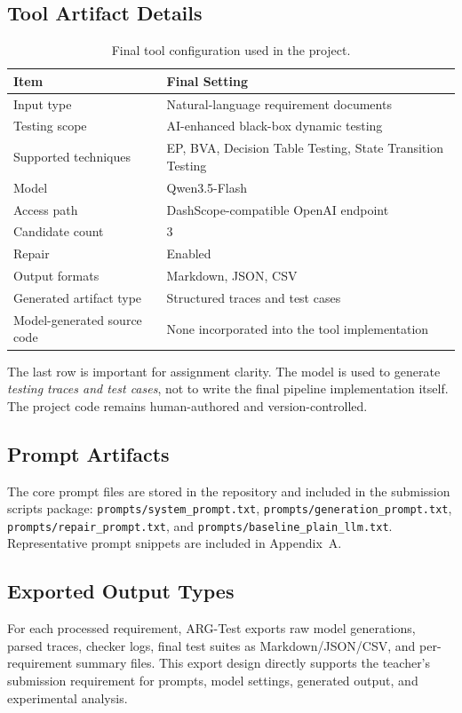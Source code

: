 \documentclass{article}
\begin{document}
\subsection{Tool Artifact Details}
\begin{table}[h]
\centering
\small
\begin{tabular}{p{} p{}}
\toprule
\textbf{Item} & \textbf{Final Setting} \\
\midrule
Input type & Natural-language requirement documents \\
Testing scope & AI-enhanced black-box dynamic testing \\
Supported techniques & EP, BVA, Decision Table Testing, State Transition Testing \\
Model & Qwen3.5-Flash \\
Access path & DashScope-compatible OpenAI endpoint \\
Candidate count & 3 \\
Repair & Enabled \\
Output formats & Markdown, JSON, CSV \\
Generated artifact type & Structured traces and test cases \\
Model-generated source code & None incorporated into the tool implementation \\
\bottomrule
\end{tabular}
\caption{Final tool configuration used in the project.}
\label{tab:toolconfig}
\end{table}

The last row is important for assignment clarity. The model is used to generate \emph{testing traces and test cases}, not to write the final pipeline implementation itself. The project code remains human-authored and version-controlled.

\subsection{Prompt Artifacts}
The core prompt files are stored in the repository and included in the submission scripts package: \texttt{prompts/system\_prompt.txt}, \texttt{prompts/generation\_prompt.txt}, \texttt{prompts/repair\_prompt.txt}, and \texttt{prompts/baseline\_plain\_llm.txt}. Representative prompt snippets are included in Appendix~A.

\subsection{Exported Output Types}
For each processed requirement, ARG-Test exports raw model generations, parsed traces, checker logs, final test suites as Markdown/JSON/CSV, and per-requirement summary files. This export design directly supports the teacher's submission requirement for prompts, model settings, generated output, and experimental analysis.
\end{document}
